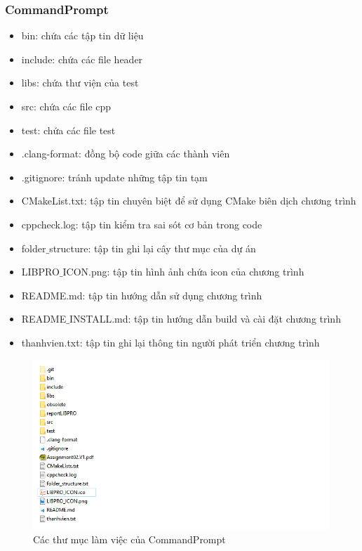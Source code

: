 \documentclass[12pt,a4paper]{report}
\begin{document}
			\subsubsection{CommandPrompt}
			\begin{itemize}
				\item bin: chứa các tập tin dữ liệu
				\item include: chứa các file header
				\item libs: chứa thư viện của test
				\item src: chứa các file cpp
				\item test: chứa các file test
				\item .clang-format: đồng bộ code giữa các thành viên
				\item .gitignore: tránh update những tập tin tạm
				\item CMakeList.txt: tập tin chuyên biệt để sử dụng CMake biên dịch chương trình
				\item cppcheck.log: tập tin kiểm tra sai sót cơ bản trong code
				\item folder$\_$structure: tập tin ghi lại cây thư mục của dự án
				\item LIBPRO$\_$ICON.png: tập tin hình ảnh chứa icon của chương trình
				\item README.md: tập tin hướng dẫn sử dụng chương trình
				\item README$\_$INSTALL.md: tập tin hướng dẫn build và cài đặt chương trình
				\item thanhvien.txt: tập tin ghi lại thông tin người phát triển chương trình
			\end{itemize}
			\begin{figure}[H]
				\centering

				\label{F:commandfolder}
				\includegraphics[scale = 1]{commandfolder.png}
				\caption{Các thư mục làm việc của CommandPrompt}
			\end{figure}
\end{document}
